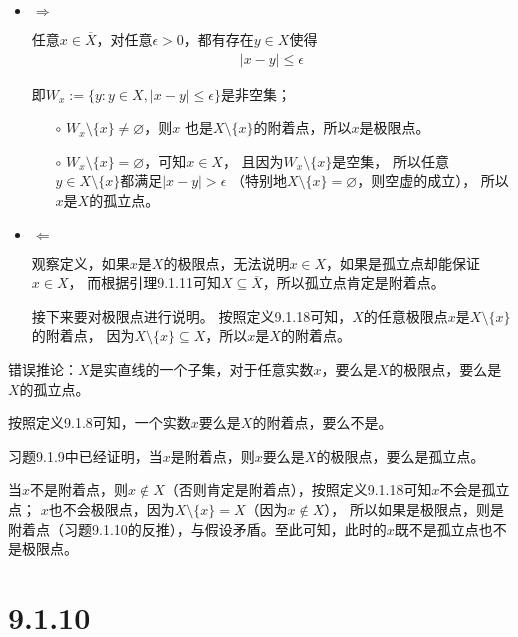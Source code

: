 \documentclass{article}
\begin{document}
\begin{itemize}
      \item $\Rightarrow$

            任意$x \in \overline{X}$，对任意$\epsilon > 0$，都有存在$y \in X$使得
            \begin{align*}
                  |x - y| \leq \epsilon
            \end{align*}

            即$W_x :=\{y: y \in X, |x-y| \leq \epsilon \}$是非空集；

            \begin{itemize}
                  \item[$\circ$] $W_x \setminus \{x\} \neq \varnothing$，则$x$
                        也是$X \setminus \{x\}$的附着点，所以$x$是极限点。
                  \item[$\circ$] $W_x \setminus \{x\} = \varnothing$，可知$x \in X$，
                        且因为$W_x \setminus \{x\}$是空集，
                        所以任意$y \in X \setminus \{x\}$都满足$|x-y| > \epsilon$
                        （特别地$X \setminus \{x\} = \varnothing$，则空虚的成立），
                        所以$x$是$X$的孤立点。
            \end{itemize}
      \item $\Leftarrow$

            观察定义，如果$x$是$X$的极限点，无法说明$x \in X$，如果是孤立点却能保证$x \in X$，
            而根据引理9.1.11可知$X \subseteq \overline{X}$，所以孤立点肯定是附着点。

            接下来要对极限点进行说明。
            按照定义9.1.18可知，$X$的任意极限点$x$是$X \setminus \{x\}$的附着点，
            因为$X \setminus \{x\} \subseteq X$，所以$x$是$X$的附着点。
\end{itemize}


\begin{zremark}
      错误推论：$X$是实直线的一个子集，对于任意实数$x$，要么是$X$的极限点，要么是$X$的孤立点。

      按照定义9.1.8可知，一个实数$x$要么是$X$的附着点，要么不是。

      习题9.1.9中已经证明，当$x$是附着点，则$x$要么是$X$的极限点，要么是孤立点。

      当$x$不是附着点，则$x \notin X$（否则肯定是附着点），按照定义9.1.18可知$x$不会是孤立点；
      $x$也不会极限点，因为$X \setminus \{x\} = X$（因为$x \notin X$），
      所以如果是极限点，则是附着点（习题9.1.10的反推），与假设矛盾。至此可知，此时的$x$既不是孤立点也不是极限点。

\end{zremark}

\section*{9.1.10}
\end{document}
